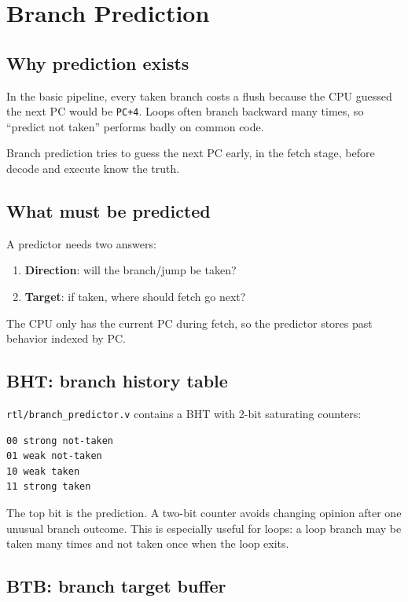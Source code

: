 \section{Branch Prediction}

\subsection{Why prediction exists}

In the basic pipeline, every taken branch costs a flush because the CPU guessed the next PC would be \texttt{PC+4}. Loops often branch backward many times, so “predict not taken” performs badly on common code.

Branch prediction tries to guess the next PC early, in the fetch stage, before decode and execute know the truth.

\subsection{What must be predicted}

A predictor needs two answers:

\begin{enumerate}
\item \textbf{Direction}: will the branch/jump be taken?
\item \textbf{Target}: if taken, where should fetch go next?
\end{enumerate}

The CPU only has the current PC during fetch, so the predictor stores past behavior indexed by PC.

\subsection{BHT: branch history table}

\texttt{rtl/branch\_predictor.v} contains a BHT with 2-bit saturating counters:

\begin{lstlisting}[language={}]
00 strong not-taken
01 weak not-taken
10 weak taken
11 strong taken
\end{lstlisting}

The top bit is the prediction. A two-bit counter avoids changing opinion after one unusual branch outcome. This is especially useful for loops: a loop branch may be taken many times and not taken once when the loop exits.

\subsection{BTB: branch target buffer}

